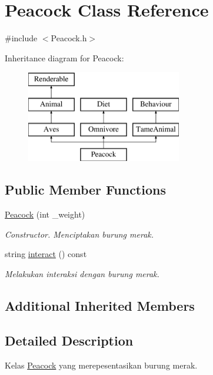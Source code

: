 \hypertarget{classPeacock}{\section{Peacock Class Reference}
\label{classPeacock}
}


{\ttfamily \#include $<$Peacock.\+h$>$}

Inheritance diagram for Peacock\+:\begin{figure}[H]
\begin{center}
\leavevmode
\includegraphics[height=4.000000cm]{classPeacock}
\end{center}
\end{figure}
\subsection*{Public Member Functions}
\begin{DoxyCompactItemize}
\item 
\hypertarget{classPeacock_aab6557d413568de2bcfeb74616340775}{\hyperlink{classPeacock_aab6557d413568de2bcfeb74616340775}{Peacock} (int \+\_\+weight)}\label{classPeacock_aab6557d413568de2bcfeb74616340775}

\begin{DoxyCompactList}\small\item\em Constructor. Menciptakan burung merak. \end{DoxyCompactList}\item 
string \hyperlink{classPeacock_a2d16ab89e04e3cbbef24c94181417e7f}{interact} () const 
\begin{DoxyCompactList}\small\item\em Melakukan interaksi dengan burung merak. \end{DoxyCompactList}\end{DoxyCompactItemize}
\subsection*{Additional Inherited Members}


\subsection{Detailed Description}
Kelas \hyperlink{classPeacock}{Peacock} yang merepesentasikan burung merak. 

